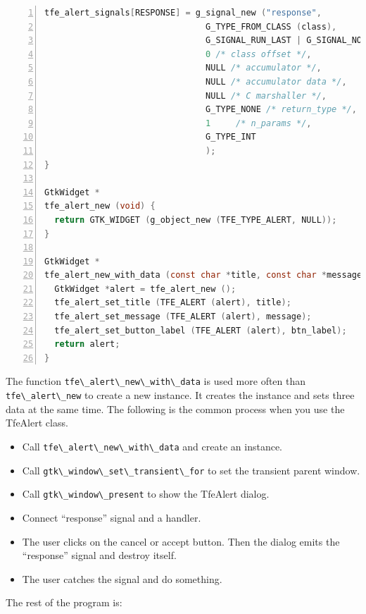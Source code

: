 \begin{lstlisting}[language=C, numbers=left]
  tfe_alert_signals[RESPONSE] = g_signal_new ("response",
                                G_TYPE_FROM_CLASS (class),
                                G_SIGNAL_RUN_LAST | G_SIGNAL_NO_RECURSE | G_SIGNAL_NO_HOOKS,
                                0 /* class offset */,
                                NULL /* accumulator */,
                                NULL /* accumulator data */,
                                NULL /* C marshaller */,
                                G_TYPE_NONE /* return_type */,
                                1     /* n_params */,
                                G_TYPE_INT
                                );
}

GtkWidget *
tfe_alert_new (void) {
  return GTK_WIDGET (g_object_new (TFE_TYPE_ALERT, NULL));
}

GtkWidget *
tfe_alert_new_with_data (const char *title, const char *message, const char* btn_label) {
  GtkWidget *alert = tfe_alert_new ();
  tfe_alert_set_title (TFE_ALERT (alert), title);
  tfe_alert_set_message (TFE_ALERT (alert), message);
  tfe_alert_set_button_label (TFE_ALERT (alert), btn_label);
  return alert;
}
\end{lstlisting}

The function \passthrough{\lstinline!tfe\_alert\_new\_with\_data!} is
used more often than \passthrough{\lstinline!tfe\_alert\_new!} to create
a new instance. It creates the instance and sets three data at the same
time. The following is the common process when you use the TfeAlert
class.

\begin{itemize}
\tightlist
\item
  Call \passthrough{\lstinline!tfe\_alert\_new\_with\_data!} and create
  an instance.
\item
  Call \passthrough{\lstinline!gtk\_window\_set\_transient\_for!} to set
  the transient parent window.
\item
  Call \passthrough{\lstinline!gtk\_window\_present!} to show the
  TfeAlert dialog.
\item
  Connect ``response'' signal and a handler.
\item
  The user clicks on the cancel or accept button. Then the dialog emits
  the ``response'' signal and destroy itself.
\item
  The user catches the signal and do something.
\end{itemize}

The rest of the program is:

